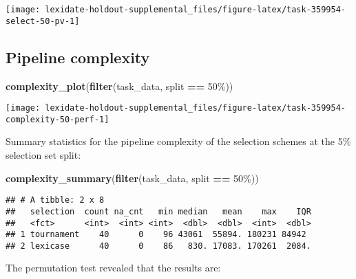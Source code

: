\documentclass[
]{book}
\newenvironment{Shaded}{\begin{snugshade}}{\end{snugshade}}
\newcommand{\FunctionTok}[1]{\textcolor[rgb]{0.13,0.29,0.53}{\textbf{#1}}}
\newcommand{\NormalTok}[1]{#1}
\newcommand{\SpecialCharTok}[1]{\textcolor[rgb]{0.81,0.36,0.00}{\textbf{#1}}}
\newcommand{\StringTok}[1]{\textcolor[rgb]{0.31,0.60,0.02}{#1}}
\begin{document}
\texttt{[image: lexidate-holdout-supplemental\_files/figure-latex/task-359954-select-50-pv-1]}

\hypertarget{pipeline-complexity-7}{%
\subsection{Pipeline complexity}\label{pipeline-complexity-7}}

\begin{Shaded}
\begin{Highlighting}[]
\FunctionTok{complexity\_plot}\NormalTok{(}\FunctionTok{filter}\NormalTok{(task\_data, split }\SpecialCharTok{==} \StringTok{\textquotesingle{}50\%\textquotesingle{}}\NormalTok{))}
\end{Highlighting}
\end{Shaded}

\texttt{[image: lexidate-holdout-supplemental\_files/figure-latex/task-359954-complexity-50-perf-1]}

Summary statistics for the pipeline complexity of the selection schemes at the 5\% selection set split:

\begin{Shaded}
\begin{Highlighting}[]
\FunctionTok{complexity\_summary}\NormalTok{(}\FunctionTok{filter}\NormalTok{(task\_data, split }\SpecialCharTok{==} \StringTok{\textquotesingle{}50\%\textquotesingle{}}\NormalTok{))}
\end{Highlighting}
\end{Shaded}

\begin{verbatim}
## # A tibble: 2 x 8
##   selection  count na_cnt   min median   mean    max    IQR
##   <fct>      <int>  <int> <int>  <dbl>  <dbl>  <int>  <dbl>
## 1 tournament    40      0    96 43061  55894. 180231 84942 
## 2 lexicase      40      0    86   830. 17083. 170261  2084.
\end{verbatim}

The permutation test revealed that the results are:
\end{document}
